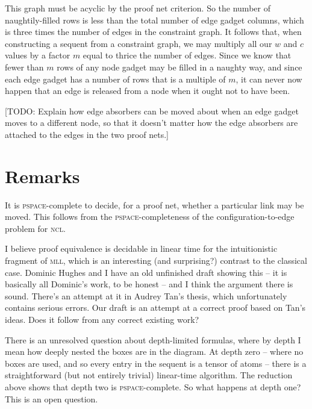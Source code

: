 \documentclass{robinminion}
\begin{document}
This graph must be acyclic by the proof net criterion. So the number of naughtily-filled rows is less than the total number of edge gadget columns, which is three times the number of edges in the constraint graph. It follows that, when constructing a sequent from a constraint graph, we may multiply all our $w$ and $c$ values by a factor $m$ equal to thrice the number of edges. Since we know that fewer than $m$ rows of any node gadget may be filled in a naughty way, and since each edge gadget has a number of rows that is a multiple of $m$, it can never now happen that an edge is released from a node when it ought not to have been.

[TODO: Explain how edge absorbers can be moved about when an edge gadget moves to a different node, so that it doesn't matter how the edge absorbers are attached to the edges in the two proof nets.]


\section*{Remarks}
It is \textsc{pspace}-complete to decide, for a proof net, whether a particular link may be moved. This follows from the \textsc{pspace}-completeness of the configuration-to-edge problem for \textsc{ncl}.

I believe proof equivalence is decidable in linear time for the intuitionistic fragment of \textsc{mll}, which is an interesting (and surprising?) contrast to the classical case. Dominic Hughes and I have an old unfinished draft showing this -- it is basically all Dominic's work, to be honest -- and I think the argument there is sound. There's an attempt at it in Audrey Tan's thesis, which unfortunately contains serious errors. Our draft is an attempt at a correct proof based on Tan's ideas. Does it follow from any correct existing work?

There is an unresolved question about depth-limited formulas, where by depth I mean how deeply nested the boxes are in the diagram. At depth zero -- where no boxes are used, and so every entry in the sequent is a tensor of atoms -- there is a straightforward (but not entirely trivial) linear-time algorithm. The reduction above shows that depth two is \textsc{pspace}-complete. So what happens at depth one? This is an open question.


\end{document}
